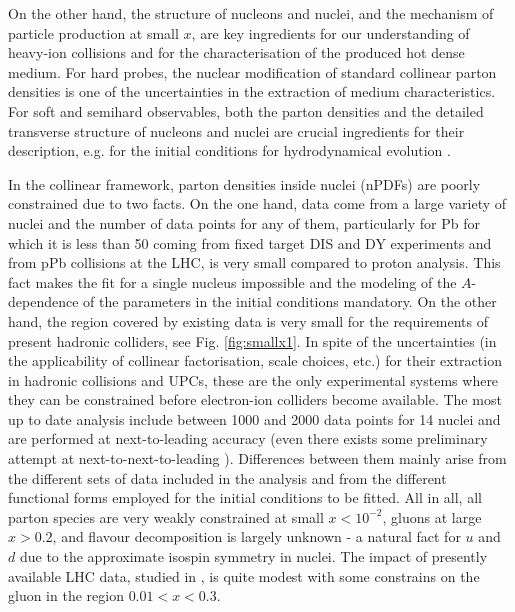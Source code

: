 \documentclass[../report.tex]{subfiles}
\begin{document}
On the other hand, the structure of nucleons and nuclei, and the mechanism of particle production at small $x$, are key ingredients for our understanding of heavy-ion collisions and for the characterisation of the produced hot dense medium. For hard probes, the nuclear modification of standard collinear parton densities is one of the uncertainties in the extraction of medium characteristics. For soft and semihard observables, both the parton densities and the detailed transverse structure of nucleons and nuclei are crucial ingredients for their description, e.g. for the initial conditions for hydrodynamical evolution \cite{Liu:2015nwa,Weller:2017tsr,Mantysaari:2017cni}.

In the collinear framework, parton densities inside nuclei (nPDFs) \cite{armestodis2018} are poorly constrained due to two facts. On the one hand, data come from a large variety of nuclei and the number of data points for any of them, particularly for Pb for which it is less than 50 coming from fixed target DIS and DY experiments and from pPb collisions at the LHC, is very small compared to proton analysis. This fact makes the fit for a single nucleus impossible and the modeling of the $A$-dependence of the parameters in the initial conditions mandatory. On the other hand, the region covered by existing data is very small for the requirements of present hadronic colliders, see Fig. \ref{fig:smallx1}. In spite of the uncertainties (in the applicability of collinear factorisation, scale choices, etc.) for their extraction in hadronic collisions and UPCs, these are the only experimental systems where they can be constrained before electron-ion colliders become available. The most up to date analysis include between 1000 and 2000 data points for 14 nuclei and are performed at next-to-leading accuracy \cite{deFlorian:2011fp,Kovarik:2015cma,Eskola:2016oht} (even there exists some preliminary attempt at next-to-next-to-leading \cite{Khanpour:2016pph}). Differences between them mainly arise from the different sets of data included in the analysis and from the different functional forms employed for the initial conditions to be fitted. All in all, all parton species are very weakly constrained at small $x<10^{-2}$, gluons at large $x>0.2$, and flavour decomposition is largely unknown - a natural fact for $u$ and $d$ due to the approximate isospin symmetry in nuclei. The impact of presently available LHC data, studied in \cite{Eskola:2016oht}, is quite modest with some constrains on the gluon in the region $0.01<x<0.3$.
\end{document}
